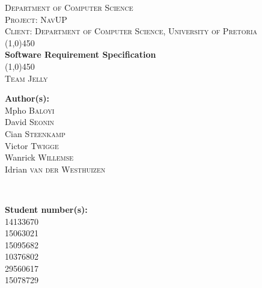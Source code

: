 \documentclass[a4paper,12pt]{article}
\begin{document}
\begin{titlepage}
\center


\textsc{\LARGE Department of Computer Science} \\ [.5cm]
\textsc{\Large Project: NavUP} \\ [.5cm]
\textsc{\Large Client: Department of Computer Science, University of Pretoria} \\ [.5cm]
\line(1,0){450}\\[.5cm]
\huge{\bfseries Software Requirement Specification}\\
\line(1,0){450}\\[.5cm]
\textsc{\LARGE Team Jelly}\\ [0.5cm]

\begin{minipage}{0.4\textwidth}
\begin{flushleft} \large
\textbf{Author(s):}\\
Mpho \textsc{Baloyi}\\
David  \textsc{Seonin}\\
Cian  \textsc{Steenkamp}\\
Victor \textsc{Twigge}\\
Wanrick  \textsc{Willemse}\\
Idrian  \textsc{van der Westhuizen}\\
\end{flushleft}
\end{minipage}
~
\begin{minipage}{0.4\textwidth}
\begin{flushright} \large
\textbf{Student number(s):} \\
14133670\\
15063021\\
15095682\\
10376802\\
29560617\\
15078729\\
\end{flushright}
\end{minipage}\\




\vfil

\end{titlepage}
\newpage
\tableofcontents
\newpage
\end{document}
